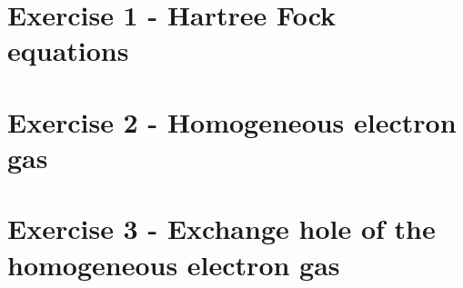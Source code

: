 








\section{Exercise 1 - Hartree Fock equations}

\section{Exercise 2 - Homogeneous electron gas}
%
\section{Exercise 3 - Exchange hole of the homogeneous electron gas}


